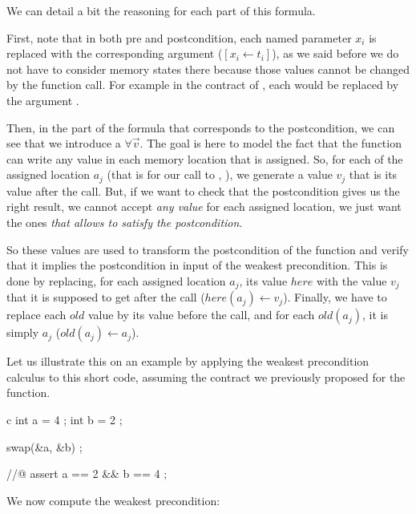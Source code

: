 We can detail a bit the reasoning for each part of this formula.


First, note that in both pre and postcondition, each named parameter $x_i$ is
replaced with the corresponding argument ($[x_i \leftarrow t_i]$), as we said
before we do not have to consider memory states there because those values
cannot be changed by the function call. For example in the contract of
, each  would be replaced by the argument
.



Then, in the part of the formula that corresponds to the postcondition, we can
see that we introduce a $\forall \vec{v}$. The goal is here to model the fact
that the function can write any value in each memory location that is assigned.
So, for each of the assigned location $a_j$ (that is for our call to
, ), we generate a value $v_j$ that is its
value after the call. But, if we want to check that the postcondition gives us
the right result, we cannot accept \emph{any value} for each assigned location,
we just want the ones \emph{that allows to satisfy the postcondition}.



So these values are used to transform the postcondition of the function and
verify that it implies the postcondition in input of the weakest precondition.
This is done by replacing, for each assigned location $a_j$, its value $here$
with the value $v_j$ that it is supposed to get after the call
($here(a_j) \leftarrow v_j$). Finally, we have to replace each $old$ value by
its value before the call, and for each $old(a_j)$, it is simply $a_j$
($old(a_j) \leftarrow a_j$).






Let us illustrate this on an example by applying the weakest precondition
calculus to this short code, assuming the contract we previously proposed for
the  function.



\begin{CodeBlock}{c}
  int a = 4 ;
  int b = 2 ;

  swap(&a, &b) ;

  //@ assert a == 2 && b == 4 ;
\end{CodeBlock}



We now compute the weakest precondition:


